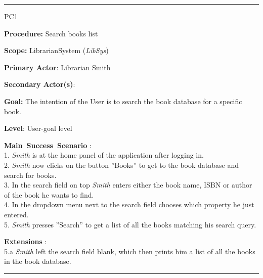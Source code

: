 \vspace{0.5cm}
\hrule
\begin{lyxlist}{PC1}
\small{
\item [\textbf{Procedure:}] Search books list
\item [\textbf{Scope:}] LibrarianSystem (\emph{LibSys})
\item [\textbf{Primary Actor}:] Librarian Smith
\item [\textbf{Secondary Actor(s)}:] 
\item [\textbf{Goal:}] The intention of the User is to search the book database
for a specific book.
\item [\textbf{Level}:] User-goal level
\item [\textbf{Main~Success~Scenario}]:\\
1. \emph{Smith} is at the home panel of the application after logging in.\\
2. \emph{Smith} now clicks on the button ''Books'' to get to the book database
and search for books.\\
3. In the search field on top \emph{Smith} enters either the book name, ISBN or
author of the book he wants to find.\\
4. In the dropdown menu next to the search field  chooses which
property he just entered.\\
5. \emph{Smith} presses ''Search'' to get a list of all the books matching his
search query.\\


\item [\textbf{Extensions}]:\\
5.a \emph{Smith} left the search field blank, which then prints him a list of
all the books in the book database.\\
}


\end{lyxlist}
\hrule


